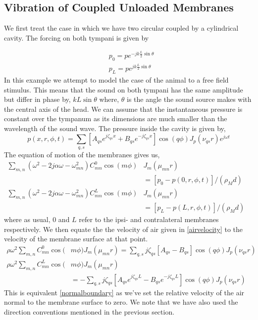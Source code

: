 \subsection{Vibration of Coupled Unloaded Membranes}
We first treat the case in which we have two circular coupled by a cylindrical cavity. The forcing
on both tympani is given by

\begin{align}
 &p_0=pe^{-jk\frac{L}{2}\sin\theta}\\
 &p_L=pe^{jk\frac{L}{2}\sin\theta}
\end{align}
In this example we attempt to model the case of the animal to a free field stimulus. This means
that the sound on both tympani has the same amplitude but differ in phase by, $kL\sin\theta$ where,
$\theta$ is the angle the sound source makes with the central axis of the head. We can assume that
the instantaneous pressure is constant over the tympanum as its dimensions are much smaller than 
the wavelength of the sound wave.
The pressure inside the cavity is given by,
\begin{equation}\label{CylCavityPressure}
 p(x,r,\phi,t)=\sum_{q,s}\left[A_{qs}e^{j\zeta_{qs}x}+B_{qs}e^{-j\zeta_{qs}x}\right]\cos(q\phi) J_p(\nu_{qs}r)e^{j\omega t}
\end{equation}
The equation of motion of the membranes gives us,
\begin{align}
 \sum_{m,n}\left(\omega^2-2j\alpha\omega-\omega^2_{mn}\right)C^0_{mn}\cos(m\phi)&J_m(\mu_{mn}r)\nonumber\\
 &=\left[p_0-p(0,r,\phi,t)\right]/(\rho_M d)\label{membraneEOM1a}\\
 \sum_{m,n}\left(\omega^2-2j\alpha\omega-\omega^2_{mn}\right)C^L_{mn}\cos(m\phi)&J_m(\mu_{mn}r)&\nonumber\\
 &=\left[p_L-p(L,r,\phi,t)\right]/(\rho_M d)\label{membraneEOM1b}
\end{align}
where as usual, $0$ and $L$ refer to the ipsi- and contralateral membranes respectively. We then equate the
the velocity of air given in \eqref{airvelocity} to the velocity of the membrane surface at that point. 
\begin{align}
 \rho\omega^2\sum_{m,n}C^0_{mn}\cos(&m\phi)J_m(\mu_{mn}r)=\sum_{q,s}j\zeta_{qs}\left[A_{qs}-B_{qs}\right]\cos(q\phi) J_p(\nu_{qs}r)\label{vboundary1a}\\
 \rho\omega^2\sum_{m,n}C^L_{mn}\cos(&m\phi)J_m(\mu_{mn}r)\nonumber\\
 &=-\sum_{q,s}j\zeta_{qs}\left[A_{qs}e^{j\zeta_{qs}L}-B_{qs}e^{-j\zeta_{qs}L}\right]\cos(q\phi) J_p(\nu_{qs}r)\label{vboundary1b}
\end{align}
This is equivalent \eqref{normalboundary} as we've set the relative velocity of the air normal to the 
membrane surface to zero. We note that we have also used the direction conventions mentioned in the previous section.

